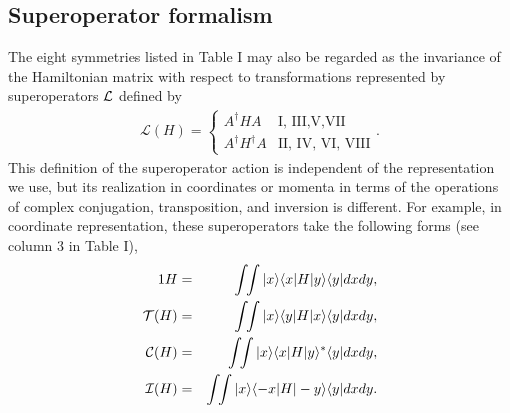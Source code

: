 \subsection{Superoperator formalism \label{super}}
%
%
%
The eight symmetries listed in Table I may also be regarded as the invariance
of the Hamiltonian matrix with respect to
transformations represented by superoperators ${\cal L}$ \cite{Simon2018} defined by
%
\begin{eqnarray}
\mathcal{L}(H)=
	\begin{cases}
      A^\dagger H A &  \text{I, III,V,VII} \\
      A^\dagger H^\dagger A &\text{II, IV, VI, VIII}
   \end{cases}.
\end{eqnarray}
%
%
%
This definition of the superoperator action is independent of the representation we use, but its realization
in coordinates or momenta in terms of the operations of complex conjugation, transposition, and inversion is different.
For example, in coordinate representation, these superoperators take the following forms (see column 3 in Table I),
%
\begin{eqnarray}
1 H&=&\int\!\!\int |x\ra \la x|H|y\ra\la y| dx dy,
\nonumber\\
{\cal T} (H) &=&\int\!\!\int |x\ra \la y|H|x\ra\la y| dx dy,
\nonumber\\
{\cal C} (H)&=&\int\!\!\int |x\ra \la x|H|y\ra^*\la y| dx dy,
\nonumber\\
{\cal I} (H)&=&\int\!\!\int |x\ra \la -x|H|-y\ra\la y| dx dy.
\label{defs}
\end{eqnarray}
%
